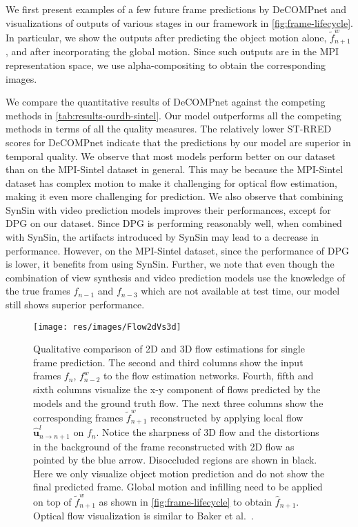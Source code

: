 \documentclass[preprint]{vgtc}
\def\etal{et al.}
\begin{document}
    We first present examples of a few future frame predictions by DeCOMPnet and visualizations of outputs of various stages in our framework in \autoref{fig:frame-lifecycle}.
    In particular, we show the outputs after predicting the object motion alone, $\tilde{f}^w_{n+1}$, and after incorporating the global motion.
    Since such outputs are in the MPI representation space, we use alpha-compositing to obtain the corresponding images.

    We compare the quantitative results of DeCOMPnet against the competing methods in \autoref{tab:results-ourdb-sintel}.
    Our model outperforms all the competing methods in terms of all the quality measures.
    The relatively lower ST-RRED scores for DeCOMPnet indicate that the predictions by our model are superior in temporal quality.
    We observe that most models perform better on our dataset than on the MPI-Sintel dataset in general.
    This may be because the MPI-Sintel dataset has complex motion to make it challenging for optical flow estimation, making it even more challenging for prediction.
    We also observe that combining SynSin with video prediction models improves their performances, except for DPG on our dataset.
    Since DPG is performing reasonably well, when combined with SynSin, the artifacts introduced by SynSin may lead to a decrease in performance.
    However, on the MPI-Sintel dataset, since the performance of DPG is lower, it benefits from using SynSin.
Further, we note that even though the combination of view synthesis and video prediction models use the knowledge of the true frames $f_{n-1}$ and $f_{n-3}$ which are not available at test time, our model still shows superior performance.

    \begin{figure*}
        \centering
        \texttt{[image: res/images/Flow2dVs3d]}
        \caption{Qualitative comparison of 2D and 3D flow estimations for single frame prediction.
The second and third columns show the input frames $f_n$, $f^w_{n-2}$ to the flow estimation networks. Fourth, fifth and sixth columns visualize the x-y component of flows predicted by the models and the ground truth flow.
        The next three columns show the corresponding frames $\tilde{f}^w_{n+1}$ reconstructed by applying local flow $\hat{\mathbf{u}}^l_{n \rightarrow n+1}$ on $f_n$.
        Notice the sharpness of 3D flow and the distortions in the background of the frame reconstructed with 2D flow as pointed by the blue arrow.
        Disoccluded regions are shown in black.
        Here we only visualize object motion prediction and do not show the final predicted frame.
        Global motion and infilling need to be applied on top of $\tilde{f}^w_{n+1}$ as shown in \autoref{fig:frame-lifecycle} to obtain $\hat{f}_{n+1}$.
        Optical flow visualization is similar to Baker \etal~\cite{baker2011middlebury}.
}
        \label{fig:flow-2d-vs-3d}
    \end{figure*}
\end{document}
